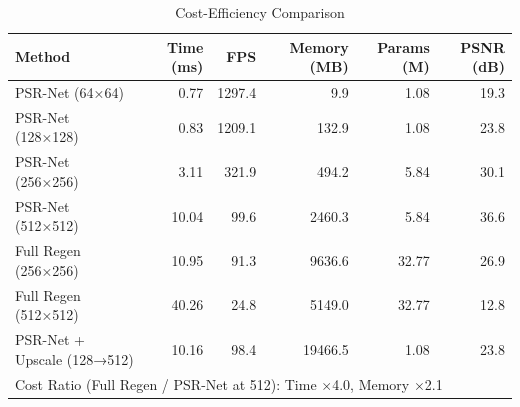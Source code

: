 \begin{table}[htbp]
  \centering
  \caption{Cost-Efficiency Comparison}
  \label{tab:cost_efficiency}
  \begin{tabular}{lrrrrr}
    \toprule
    Method & Time (ms) & FPS & Memory (MB) & Params (M) & PSNR (dB) \\
    \midrule
    PSR-Net (64×64) & 0.77 & 1297.4 & 9.9 & 1.08 & 19.3 \\
    PSR-Net (128×128) & 0.83 & 1209.1 & 132.9 & 1.08 & 23.8 \\
    PSR-Net (256×256) & 3.11 & 321.9 & 494.2 & 5.84 & 30.1 \\
    PSR-Net (512×512) & 10.04 & 99.6 & 2460.3 & 5.84 & 36.6 \\
    Full Regen (256×256) & 10.95 & 91.3 & 9636.6 & 32.77 & 26.9 \\
    Full Regen (512×512) & 40.26 & 24.8 & 5149.0 & 32.77 & 12.8 \\
    PSR-Net + Upscale (128→512) & 10.16 & 98.4 & 19466.5 & 1.08 & 23.8 \\
    \midrule
    \multicolumn{6}{l}{Cost Ratio (Full Regen / PSR-Net at 512): Time $\times$4.0, Memory $\times$2.1} \\
    \bottomrule
  \end{tabular}
\end{table}